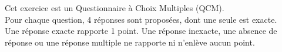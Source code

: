 \documentclass[12pt,a4paper]{article}  %
\begin{document}
\graphicspath{{images/}}

\begin{center}
\fbox{
\begin{minipage}[]{15cm}
\begin{center}
	\LARGE{\rule{0.5cm}{0pt}\rule[-0.25cm]{0pt}{0.9cm}
		\textcolor{red}{Correction - Préparation Bac Blanc}
	}
\end{center}
\end{minipage}
}

\end{center}



%

\vspace*{-0.8cm}

Cet exercice est un Questionnaire à Choix Multiples (QCM).\\
Pour chaque question, 4 réponses sont proposées, dont une seule est exacte.\\
Une réponse exacte rapporte 1 point. Une réponse inexacte, une absence de réponse ou une réponse multiple ne rapporte ni n'enlève aucun point.
\end{document}
